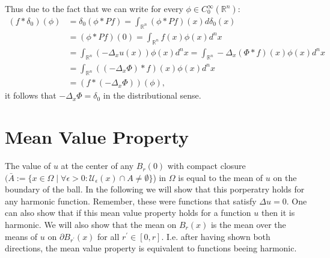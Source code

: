 \documentclass[A4,12pt,twoside]{book}
\begin{document}
Thus due to the fact that we can write for every $\phi \in C_0^\infty (\mathbb{R}^n):$
\begin{align*}
    (f* \delta_0 )(\phi) &= \delta_0 (\phi * Pf) =\int_{\mathbb{R}^n} (\phi * Pf) (x) d \delta_0 (x) \\
    &= (\phi * Pf) (0) = \int_{\mathbb{R}^n } f(x) \phi (x) d^n x \\
    &= \int_{\mathbb{R}^n } (-\Delta_x u(x) ) \phi (x) d^n x = \int_{\mathbb{R}^n } -\Delta_x (\Phi * f)(x)  \phi (x) d^n x \\
    &= \int_{\mathbb{R}^n } ((-\Delta_x \Phi) * f)(x)  \phi (x) d^n x \\
    &= (f* (-\Delta_x \Phi) ) (\phi),
\end{align*}
it follows that $-\Delta_x \Phi = \delta_0$ in the distributional sense.

\section{Mean Value Property}
The value of $u$ at the center of any $B_r (0)$ with compact closure $(\bar{A}:= \{ x \in \Omega \mid \forall \epsilon>0: \mathcal{U}_\epsilon (x) \cap A \neq \emptyset \}$) in $\Omega$ is equal to the mean of $u$ on the boundary of the ball. In the following we will show that this porperatry holds for any harmonic function. Remember, these were functions that satisfy $\Delta u =0$. One can also show that if this mean value property holds for a function $u$ then it is harmonic. We will also show that the mean on $B_r (x)$ is the mean over the means of $u$ on $\partial B_{r^\prime } (x)$ for all $r^\prime \in [0,r]$. I.e. after having shown both directions, the mean value property is equivalent to functions beeing harmonic.
\end{document}
